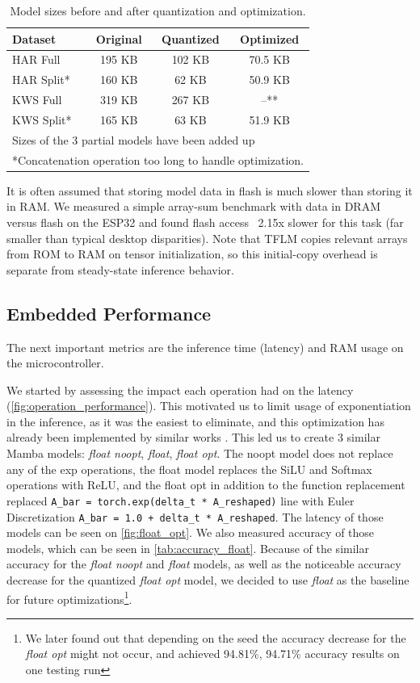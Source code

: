 \begin{table}[ht]
  \centering
  \caption{Model sizes before and after quantization and optimization.}
  \label{tab:size-results}
  \begin{tabular}{lccc}
    Dataset & Original & Quantized & Optimized \\
    \midrule
    HAR Full & 195 KB & 102 KB & 70.5 KB \\
    HAR Split* & 160 KB & 62 KB & 50.9 KB \\
    \midrule
    KWS Full & 319 KB & 267 KB & --** \\
    KWS Split* & 165 KB & 63 KB & 51.9 KB \\
    \bottomrule
    \multicolumn{4}{l}{\footnotesize *Sizes of the 3 partial models have been added up} \\
    \multicolumn{4}{l}{\footnotesize **Concatenation operation too long to handle optimization.} \\
  \end{tabular}
\end{table}

It is often assumed that storing model data in flash is much slower than storing it in RAM. We measured a simple array-sum benchmark with data in DRAM versus flash on the ESP32 and found flash access ~2.15x slower for this task (far smaller than typical desktop disparities). Note that TFLM copies relevant arrays from ROM to RAM on tensor initialization, so this initial-copy overhead is separate from steady-state inference behavior.

\subsection{Embedded Performance}

The next important metrics are the inference time (latency) and RAM usage on the microcontroller.

We started by assessing the impact each operation had on the latency (\autoref{fig:operation_performance}). This motivated us to limit usage of exponentiation in the inference, as it was the easiest to eliminate, and this optimization has already been implemented by similar works \cite{kimEMambaEfficientAcceleration2025}. This led us to create 3 similar Mamba models: \textit{float noopt}, \textit{float}, \textit{float opt}. The noopt model does not replace any of the exp operations, the float model replaces the SiLU and Softmax operations with ReLU, and the float opt in addition to the function replacement replaced \texttt{A\_bar = torch.exp(delta\_t * A\_reshaped)} line with Euler Discretization \texttt{A\_bar = 1.0 + delta\_t * A\_reshaped}. The latency of those models can be seen on \autoref{fig:float_opt}. We also measured accuracy of those models, which can be seen in \autoref{tab:accuracy_float}. Because of the similar accuracy for the \textit{float noopt} and \textit{float} models, as well as the noticeable accuracy decrease for the quantized \textit{float opt} model, we decided to use \textit{float} as the baseline for future optimizations\footnote{We later found out that depending on the seed the accuracy decrease for the \textit{float opt} might not occur, and achieved 94.81\%, 94.71\% accuracy results on one testing run}.

